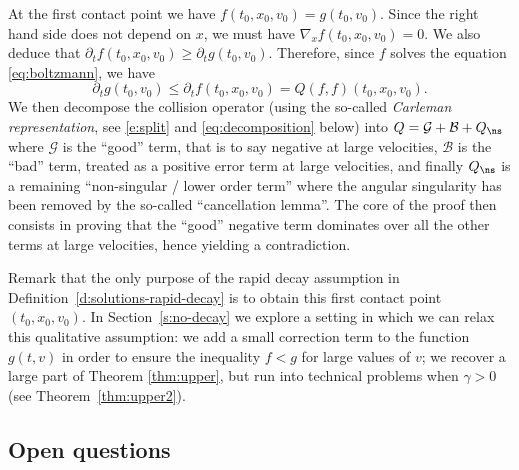 At the first contact point we have $f(t_0,x_0,v_0)= g(t_0,v_0)$.
Since the right hand side does not depend on $x$, we must have
$\nabla_x f(t_0,x_0,v_0)=0$. We also deduce that
$\partial_t f(t_0,x_0,v_0) \geq \partial_t g(t_0,v_0)$. Therefore,
since $f$ solves the equation \eqref{eq:boltzmann}, we have
\begin{equation} \label{e:to-contradict} \partial_t g(t_0,v_0) \leq
\partial_t f (t_0,x_0,v_0)= Q(f,f) (t_0,x_0,v_0).
\end{equation}
We then decompose the collision operator (using the
so-called \emph{Carleman representation}, see \eqref{e:split} and
\eqref{eq:decomposition} below) into
$Q=\mathcal G + \mathcal B + Q_{\ns}$ where $\mathcal G$ is the
``good'' term, that is to say negative at large velocities,
$\mathcal B$ is the ``bad'' term, treated as a positive error term at
large velocities, and finally $Q_{\ns}$ is a remaining ``non-singular / lower order
term'' where the angular singularity has been
removed by the so-called ``cancellation lemma''. The core of the
proof then consists in proving that the ``good'' negative term
dominates over all the other terms at large velocities, hence yielding
a contradiction.

Remark that the only purpose of the rapid decay assumption in
Definition~\ref{d:solutions-rapid-decay} is to obtain this first
contact point $(t_0,x_0,v_0)$. In Section~\ref{s:no-decay} we explore
a setting in which we can relax this qualitative assumption: we add a
small correction term to the function $g(t,v)$ in order to ensure the
inequality $f < g$ for large values of $v$; we recover a large part of
Theorem \ref{thm:upper}, but run into technical problems when
$\gamma > 0$ (see Theorem~\ref{thm:upper2}).

\subsection{Open questions}

